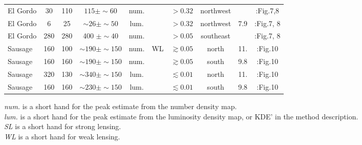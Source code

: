 \begin{table*}
\begin{tabular}{@{}lccccccccc@{}}
		El Gordo & 30 & 110 & $ 115 \pm \sim 60$ & num. & & $>0.32$ & 
		northwest&   &\citealt{Jee2014}:Fig.7,8  \\
		El Gordo & 6 & 25& $\sim 26 \pm \sim 50$ & lum. & & $>0.32$ & northwest & 7.9   
		&\citealt{Jee2014}:Fig.7, 8  \\
		El Gordo & 280 & 280 & 400 $\pm \sim 40$ & num. & & $>0.05$ &
		southeast &   &\citealt{Jee2014}:Fig.7, 8  \\
		Sausage &160 & 100& $\sim 190\pm \sim 150$ & num. & WL & $\gtrsim
		0.05$ & north & 11.  &\citealt{Jee2015}:Fig.10\\ 
		Sausage &160 & 160& $ \sim 190\pm \sim 150 $  & num. &  & $\gtrsim
		0.05$ & south & 9.8 & \citealt{Jee2015}:Fig.10\\ 

		Sausage & 320 & 130 & $\sim340 \pm \sim 150 $  & lum. & & $\lesssim
		0.01$ & north & 11. & \citealt{Jee2015}:Fig.10\\ 

		Sausage & 160 & 160 &$\sim230 \pm \sim 150 $  & lum. & & $\lesssim
		0.01$ & south & 9.8 &\citealt{Jee2015}:Fig.10\\ 
	 \hline
	 \end{tabular} 
	 \raggedright{
		 {\it num.} is a short hand for the peak estimate from the number
		 density map. \\
		 {\it lum.} is a short hand for the peak estimate from the luminosity
		 density map, or KDE' in the method description. \\
		 {\it SL} is a short hand for strong lensing. \\
		 {\it WL} is a short hand for weak lensing. \\
	 }

\end{table*}





